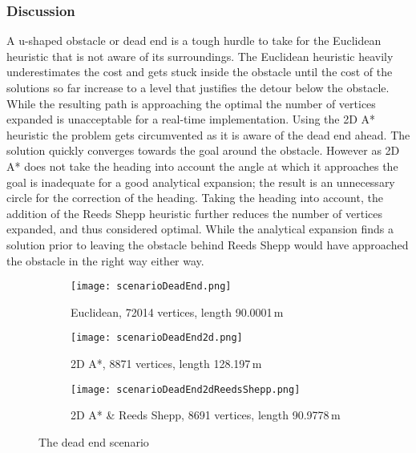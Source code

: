 \subsubsection{Discussion}
A u-shaped obstacle or dead end is a tough hurdle to take for the Euclidean heuristic that is not aware of its surroundings. The Euclidean heuristic heavily underestimates the cost and gets stuck inside the obstacle until the cost of the solutions so far increase to a level that justifies the detour below the obstacle. While the resulting path is approaching the optimal the number of vertices expanded is unacceptable for a real-time implementation.
Using the 2D A* heuristic the problem gets circumvented as it is aware of the dead end ahead. The solution quickly converges towards the goal around the obstacle. However as 2D A* does not take the heading into account the angle at which it approaches the goal is inadequate for a good analytical expansion; the result is an unnecessary circle for the correction of the heading. Taking the heading into account, the addition of the Reeds Shepp heuristic further reduces the number of vertices expanded, and thus considered optimal. While the analytical expansion finds a solution prior to leaving the obstacle behind Reeds Shepp would have approached the obstacle in the right way either way.

\begin{figure}[h]
    \centering
    \begin{subfigure}[t]{\textwidth}
        \texttt{[image: scenarioDeadEnd.png]}
        \caption{Euclidean, 72014 vertices, length 90.0001\,m}
        \label{fig:scenarioDeadEnd}
    \end{subfigure}
    \begin{subfigure}[t]{\textwidth}
        \texttt{[image: scenarioDeadEnd2d.png]}
        \caption{2D A*, 8871 vertices, length 128.197\,m}
        \label{fig:scenarioDeadEnd2d}
    \end{subfigure}    
    \begin{subfigure}[t]{\textwidth}
        \texttt{[image: scenarioDeadEnd2dReedsShepp.png]}
        \caption{2D A* \& Reeds Shepp, 8691 vertices, length 90.9778\,m}
        \label{fig:scenarioDeadEnd2dReedsShepp}
    \end{subfigure}
    \caption{The dead end scenario}
    \label{fig:scenarioDeadEnd}
\end{figure}


